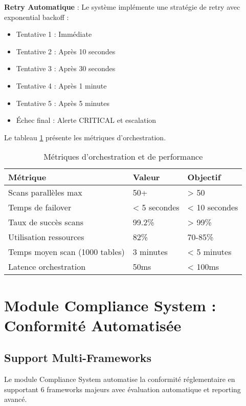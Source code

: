 \textbf{Retry Automatique} : Le système implémente une stratégie de retry avec exponential backoff :
\begin{itemize}
    \item Tentative 1 : Immédiate
    \item Tentative 2 : Après 10 secondes
    \item Tentative 3 : Après 30 secondes
    \item Tentative 4 : Après 1 minute
    \item Tentative 5 : Après 5 minutes
    \item Échec final : Alerte CRITICAL et escalation
\end{itemize}

Le tableau \ref{tab:metriques_orchestration} présente les métriques d'orchestration.

\begin{table}[htpb]
\centering
\caption{Métriques d'orchestration et de performance}
\label{tab:metriques_orchestration}
\begin{tabular}{|p{}|p{}|p{}|}
\hline
\textbf{Métrique} & \textbf{Valeur} & \textbf{Objectif} \\
\hline
Scans parallèles max & 50+ & > 50 \\
\hline
Temps de failover & < 5 secondes & < 10 secondes \\
\hline
Taux de succès scans & 99.2\% & > 99\% \\
\hline
Utilisation ressources & 82\% & 70-85\% \\
\hline
Temps moyen scan (1000 tables) & 3 minutes & < 5 minutes \\
\hline
Latence orchestration & 50ms & < 100ms \\
\hline
\end{tabular}
\end{table}

\section{Module Compliance System : Conformité Automatisée}

\subsection{Support Multi-Frameworks}

Le module Compliance System automatise la conformité réglementaire en supportant 6 frameworks majeurs avec évaluation automatique et reporting avancé.

